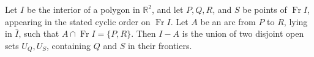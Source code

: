 Let $I$ be the interior of a polygon in $\mathbb{R}^2$, and let $P, Q, R$, and $S$ be points of $\operatorname{Fr} I$, appearing in the stated cyclic order on $\operatorname{Fr} I$. Let $A$ be an arc from $P$ to $R$, lying in $\bar{I}$, such that $A \cap \operatorname{Fr} I = \{P, R\}$. Then $I - A$ is the union of two disjoint open sets $U_Q, U_S$, containing $Q$ and $S$ in their frontiers.
